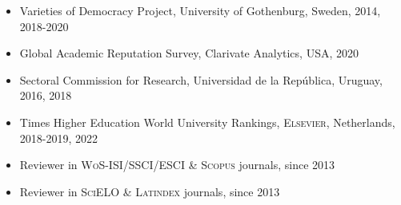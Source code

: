 





\begin{publications}

\begin{itemize}
\item{\small Varieties of Democracy Project, University of Gothenburg, Sweden, 2014, 2018-2020}
\item{\small Global Academic Reputation Survey, Clarivate Analytics, USA, 2020}
\item{\small Sectoral Commission for Research, Universidad de la Rep\'ublica, Uruguay, 2016, 2018}
\item{\small Times Higher Education World University Rankings, {\scshape Elsevier}, 
Netherlands, 2018-2019, 2022}
\item{\small Reviewer in {\scshape WoS-ISI/SSCI/ESCI} \& {\scshape Scopus} journals, since 2013}
\item{\small Reviewer in {\scshape SciELO} \& {\scshape Latindex} journals, since 2013}
\end{itemize}

\pagebreak
\end{publications}
